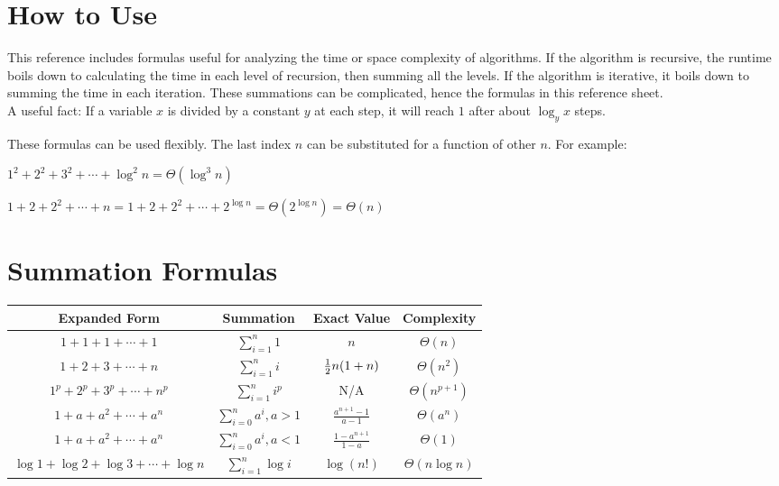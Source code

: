 \documentclass[12pt]{article}
\date{February 2020} %
\begin{document}
\section{How to Use}

    This reference includes formulas useful for analyzing the time or space
    complexity of algorithms. If the algorithm is recursive, the runtime boils down
    to calculating the time in each level of recursion, then summing all the levels.
    If the algorithm is iterative, it boils down to summing the time in each
    iteration. These summations can be complicated, hence the formulas in this
    reference sheet. \\
    
    A useful fact: If a variable $x$ is divided by a constant $y$ at each step, it
    will reach $1$ after about $\log_y x$ steps.
    
    These formulas can be used flexibly. The last index $n$ can be substituted for
    a function of other $n$. For example:
    
    $1^2+2^2+3^2+\cdots+\log^2n=\Theta(\log^3n)$
    
    $1+2+2^2+\cdots+n=1+2+2^2+\cdots+2^{\log n}=\Theta(2^{\log n})=\Theta(n)$
    
\section{Summation Formulas}

\noindent
\begin{tabular}{cc|cc}
    Expanded Form & Summation & Exact Value & Complexity \\
    \hline
    $1+1+1+\cdots+1$ & $\displaystyle\sum_{i=1}^n 1$ & $n$ & $\Theta(n)$ \\
    $1+2+3+\cdots+n$ & $\displaystyle\sum_{i=1}^n i$ & $\frac{1}{2} n(1+n)$ & $\Theta(n^2)$ \\
    $1^p+2^p+3^p+\cdots+n^p$ & $\displaystyle\sum_{i=1}^n i^p$ & N/A & $\Theta(n^{p+1})$ \\
    $1+a+a^2+\cdots+a^n$ & $\displaystyle\sum_{i=0}^n a^i, a>1$ & $\displaystyle\frac{a^{n+1}-1}{a-1}$ & $\Theta(a^n)$ \\
    $1+a+a^2+\cdots+a^n$ & $\displaystyle\sum_{i=0}^n a^i, a<1$ & $\displaystyle\frac{1-a^{n+1}}{1-a}$ & $\Theta(1)$ \\
    $\log1+\log2+\log3+\cdots+\log n$ & $\displaystyle\sum_{i=1}^n \log i$ & $\log(n!)$ & $\Theta(n\log n)$
\end{tabular}
\end{document}
